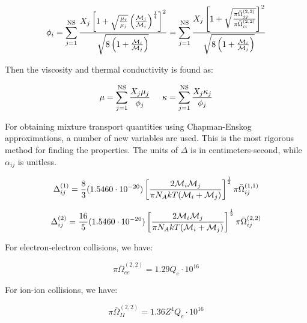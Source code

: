 \documentclass[10pt]{article}
\begin{document}
\begin{flushleft}
\begin{definition}
    \begin{equation}
        \phi_i = \sum_{j=1}^\text{NS} \frac{X_j \left[ 1 + \sqrt{\frac{\mu_i}{\mu_j}} \left( \frac{\mathcal{M}_j}{\mathcal{M}_i} \right)^\frac{1}{4} \right]^2}{\sqrt{8 \left( 1 + \frac{\mathcal{M}_i}{\mathcal{M}_j} \right)}} = \sum_{j=1}^\text{NS} \frac{X_j \left[ 1 + \sqrt{\frac{\pi \bar{\Omega}_{jj}^{(2,2)}}{\pi \bar{\Omega}_{ii}^{(2,2)}}} \right]^2}{\sqrt{8 \left( 1 + \frac{\mathcal{M}_i}{\mathcal{M}_j} \right)}}
    \end{equation}

    Then the viscosity and thermal conductivity is found as:

    \begin{equation}
        \mu = \sum_{j=1}^\text{NS} \frac{X_j \mu_j}{\phi_j} \hspace{5mm} \kappa = \sum_{j=1}^\text{NS} \frac{X_j \kappa_j}{\phi_j}
    \end{equation}    
\end{definition}


\begin{definition}
    For obtaining mixture transport quantities using Chapman-Enskog approximations, a number of new variables are used. This is the most rigorous method for finding the properties. The units of $\Delta$ is in centimeters-second, while $\alpha_{ij}$ is unitless.

    \begin{equation}
        \Delta_{ij}^{(1)} = \frac{8}{3} (1.5460 \cdot 10^{-20}) \left[ \frac{2 \mathcal{M}_i \mathcal{M}_j}{\pi N_A k T (\mathcal{M}_i + \mathcal{M}_j)} \right]^\frac{1}{2} \pi \bar{\Omega}_{ij}^{(1,1)}
    \end{equation}

    \begin{equation}
        \Delta_{ij}^{(2)} = \frac{16}{5} (1.5460 \cdot 10^{-20}) \left[ \frac{2 \mathcal{M}_i \mathcal{M}_j}{\pi N_A k T (\mathcal{M}_i + \mathcal{M}_j)} \right]^\frac{1}{2}  \pi \bar{\Omega}_{ij}^{(2,2)}
    \end{equation}

    For electron-electron collisions, we have:

    \begin{equation}
        \pi \bar{\Omega}_{ee}^{(2,2)} = 1.29 Q_e \cdot 10^{16}
    \end{equation}

    For ion-ion collisions, we have:

    \begin{equation}
        \pi \bar{\Omega}_{II}^{(2,2)} = 1.36 Z^4 Q_e \cdot 10^{16}
    \end{equation}


\end{definition}
\end{flushleft}
\end{document}
